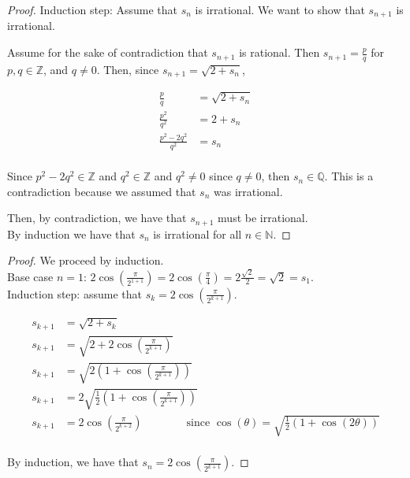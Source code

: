 \documentclass[12 pt]{exam}
\begin{document}
\begin{questions}
\begin{solution}
\begin{proof}
Induction step: Assume that $s_n$ is irrational. We want to show that $s_{n+1}$ is irrational.

Assume for the sake of contradiction that $s_{n+1}$ is rational. Then $s_{n+1} = \frac{p}{q}$ for
$p, q \in \mathbb{Z}$, and $q \ne 0$. Then, since $s_{n+1} = \sqrt{2 + s_n}$,

\begin{align*}
    \frac{p}{q} &= \sqrt{2+s_n}\\
    \frac{p^2}{q^2} &= 2+s_n\\
    \frac{p^2 - 2q^2}{q^2} &= s_n\\
\end{align*}

Since $p^2 - 2q^2 \in \mathbb{Z}$ and $q^2 \in \mathbb{Z}$ and $q^2 \ne 0$ since $q \ne 0$, then
$s_n \in \mathbb{Q}$. This is a contradiction because we assumed that $s_n$ was irrational.

Then, by contradiction, we have that $s_{n+1}$ must be irrational.\\

By induction we have that $s_n$ is irrational for all $n \in \mathbb{N}$.
\end{proof}\end{solution}


\begin{solution}\begin{proof}
We proceed by induction.\\

Base case $n=1$: $2 \cos(\frac{\pi}{2^{1+1}}) = 2 \cos(\frac{\pi}{4})
    = 2 \frac{\sqrt{2}}{2} = \sqrt{2} = s_1$.\\

Induction step: assume that $s_k = 2 \cos(\frac{\pi}{2^{k+1}})$.

\begin{align*}
    s_{k+1} &= \sqrt{2 + s_k}\\
    s_{k+1} &= \sqrt{2 + 2\cos(\frac{\pi}{2^{k+1}})}\\
    s_{k+1} &= \sqrt{2 (1 + \cos(\frac{\pi}{2^{k+1}}))}\\
    s_{k+1} &= 2\sqrt{\frac{1}{2} (1 + \cos(\frac{\pi}{2^{k+1}}))}\\
    s_{k+1} &= 2\cos(\frac{\pi}{2^{k+2}}) \qquad \qquad \text{since } \cos(\theta) = \sqrt{\frac{1}{2}(1+\cos(2 \theta))}\\
\end{align*}

By induction, we have that $s_n = 2\cos(\frac{\pi}{2^{k+1}})$.
\end{proof}\end{solution}


\end{questions}
\end{document}
